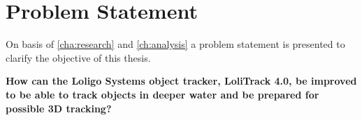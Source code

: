 \chapter{Problem Statement}
On basis of \autoref{cha:research}  and \autoref{ch:analysis}  a problem statement is presented to clarify the objective of this thesis.

\textbf{How can the Loligo Systems object tracker, LoliTrack 4.0, be improved to be able to track objects in deeper water and be prepared for possible 3D tracking?}